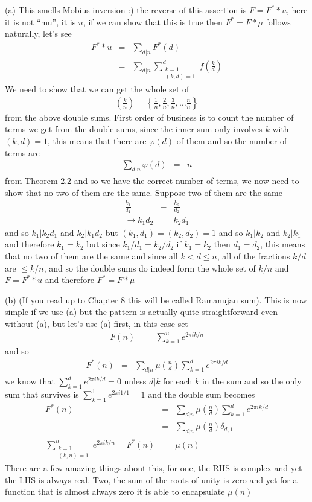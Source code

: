 \documentclass[aps,preprint,preprintnumbers,nofootinbib,showpacs,prd]{revtex4-1}
\newcommand{\nbea}{\begin{eqnarray*}}
\newcommand{\neea}{\end{eqnarray*}}
\begin{document}
(a) This smells Mobius inversion :) the reverse of this assertion is $F = F^* * u$, here it is not ``mu'', it is $u$, if we can show that this is true then $F^* = F * \mu$ follows naturally, let's see
%
\nbea
F^* * u & = & \sum_{d|n} F^*(d) \\
& = & \sum_{d|n} \sum_{\substack{k=1\\(k,d)=1}}^{d} f\left(\frac{k}{d}\right)
\neea
%
We need to show that we can get the whole set of
%
\nbea
\left(\frac{k}{n}\right) = \left\{\frac{1}{n}, \frac{2}{n}, \frac{3}{n}, \ldots \frac{n}{n}\right\}
\neea
%
from the above double sums. First order of business is to count the number of terms we get from the double sums, since the inner sum only involves $k$ with $(k,d)=1$, this means that there are $\varphi(d)$ of them and so the number of terms are
%
\nbea
\sum_{d|n}\varphi(d) & = & n
\neea
%
from Theorem 2.2 and so we have the correct number of terms, we now need to show that no two of them are the same. Suppose two of them are the same
%
\nbea
\frac{k_1}{d_1} & = & \frac{k_2}{d_2} \\
\to k_1 d_2 & = & k_2 d_1
\neea
%
and so $k_1|k_2d_1$ and $k_2|k_1d_2$ but $(k_1,d_1)=(k_2, d_2)=1$ and so $k_1|k_2$ and $k_2 | k_1$ and therefore $k_1 = k_2$ but since $k_1/d_1 = k_2/d_2$ if $k_1=k_2$ then $d_1=d_2$, this means that no two of them are the same and since all $k < d \le n$, all of the fractions $k/d$ are $\le k/n$, and so the double sums do indeed form the whole set of $k/n$ and $F = F^* * u$ and therefore $F^* = F * \mu$

(b) (If you read up to Chapter 8 this will be called Ramanujan sum). This is now simple if we use (a) but the pattern is actually quite straightforward even without (a), but let's use (a) first, in this case set
%
\nbea
F(n) & = & \sum_{k=1}^n e^{2\pi i k/n}
\neea
%
and so
%
\nbea
F^*(n) & = & \sum_{d|n} \mu\left(\frac{n}{d}\right)\sum_{k=1}^d e^{2\pi i k/d}
\neea
%
we know that $\sum_{k=1}^d e^{2\pi i k/d} = 0$ unless $d|k$ for each $k$ in the sum and so the only sum that survives is $\sum_{k=1}^1 e^{2\pi i 1/1} = 1$ and the double sum becomes
%
\nbea
F^*(n) & = & \sum_{d|n} \mu\left(\frac{n}{d}\right)\sum_{k=1}^d e^{2\pi i k/d} \\
& = & \sum_{d|n} \mu\left(\frac{n}{d}\right)\delta_{d,1} \\
\sum_{\substack{k=1\\(k,n)=1}}^n e^{2\pi i k/n} = F^*(n) & = & \mu(n)
\neea
%
There are a few amazing things about this, for one, the RHS is complex and yet the LHS is always real. Two, the sum of the roots of unity is zero and yet for a function that is almost always zero it is able to encapsulate $\mu(n)$
\end{document}
